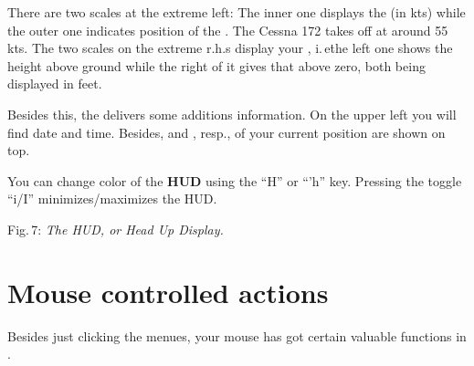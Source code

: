 There are two scales at the extreme left: The inner one displays the
 (in
kts) while the outer one indicates position of the . The Cessna
172 takes
off at around 55 kts. The two scales on the extreme r.h.s display your
,
i.\,e\. the left one shows the height above ground while the right of it gives
that above
zero, both being displayed in feet.

Besides this, the  delivers some additions information. On the upper
left you
will find date and time. Besides,   and ,
resp., of your current position are shown on top.

You can change color of the \textbf{HUD} using the ``H'' or ``'h''  key.
Pressing the toggle ``i/I'' minimizes/maximizes the HUD.

\medskip

 \centerline{}

\smallskip
 \noindent
Fig.\,7: \textit{The HUD, or Head Up Display.}
\medskip

\section{Mouse controlled actions}

Besides just clicking the menues, your mouse has got certain valuable functions
in \FlightGear{}.


